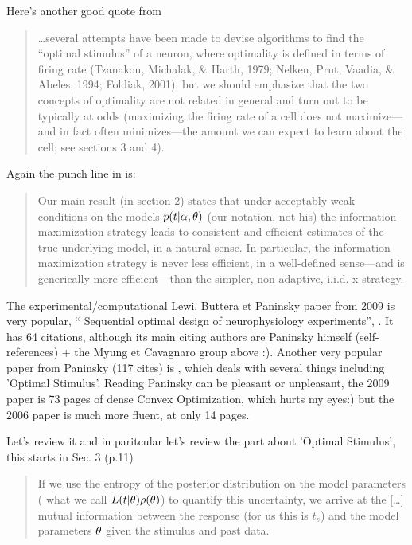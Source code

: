 Here's another good quote from 
\begin{quote}
\ldots several attempts have been made to devise algorithms
to find the “optimal stimulus” of a neuron, where optimality is
defined in terms of firing rate (Tzanakou, Michalak, & Harth, 1979; Nelken,
Prut, Vaadia, & Abeles, 1994; Foldiak, 2001), but we should emphasize that
the two concepts of optimality are not related in general and turn out to be
typically at odds (maximizing the firing rate of a cell does not maximize—
and in fact often minimizes—the amount we can expect to learn about the
cell; see sections 3 and 4).
\end{quote}
Again the punch line in \cite{Paninski2005} is:
\begin{quote}
Our main result (in section 2) states that under
acceptably weak conditions on the models $p(t| \alpha, { \theta})$ (our notation, not
his) the information maximization strategy leads to consistent and
efficient estimates of the true underlying model, in a natural sense. 
In particular, the information maximization
strategy is never less efficient, in a well-defined sense—and
is generically more efficient—than the simpler, non-adaptive, i.i.d. x strategy.
\end{quote}



The experimental/computational Lewi, Buttera et Paninsky paper from 2009 is
very popular, `` Sequential
optimal design of neurophysiology experiments'', \cite{Lewi2009}. It has 64
citations, although its main citing authors are Paninsky himself
(self-references) + the Myung et Cavagnaro group above :). Another very popular
paper from Paninsky (117 cites) is \cite{Paninski2006a}, which deals with
several things including 'Optimal Stimulus'. Reading Paninsky can be pleasant or
unpleasant, the 2009 \cite{Lewi2009}paper is 73 pages of dense Convex
Optimization, which hurts my eyes:) but the 2006 paper is much more fluent, at
only 14 pages. 

Let's review it and in paritcular let's review the part about 'Optimal
Stimulus', this starts in Sec. 3 (p.11)

\begin{quote}
If we use the entropy of the posterior
distribution on the model parameters ( what we call $L(t|{ \theta})
\rho({ \theta})$) to quantify this uncertainty, we arrive at the [\ldots] 
mutual information between the response (for us this is $t_s$) and the model
parameters ${ \theta}$ given the stimulus and past data.  
\end{quote}


